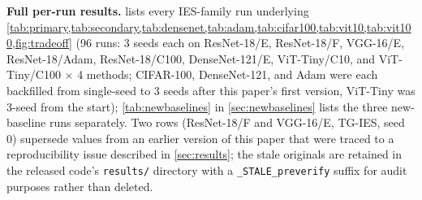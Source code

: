 \documentclass{article}
\theoremstyle{plain}
\theoremstyle{definition}
\theoremstyle{remark}
\begin{document}
\textbf{Full per-run results.}  lists every IES-family run underlying \cref{tab:primary,tab:secondary,tab:densenet,tab:adam,tab:cifar100,tab:vit10,tab:vit100,fig:tradeoff} (96 runs: 3 seeds each on ResNet-18/E, ResNet-18/F, VGG-16/E, ResNet-18/Adam, ResNet-18/C100, DenseNet-121/E, ViT-Tiny/C10, and ViT-Tiny/C100 $\times$ 4 methods; CIFAR-100, DenseNet-121, and Adam were each backfilled from single-seed to 3 seeds after this paper's first version, ViT-Tiny was 3-seed from the start); \cref{tab:newbaselines} in \cref{sec:newbaselines} lists the three new-baseline runs separately. Two rows (ResNet-18/F and VGG-16/E, TG-IES, seed 0) supersede values from an earlier version of this paper that were traced to a reproducibility issue described in \cref{sec:results}; the stale originals are retained in the released code's \texttt{results/} directory with a \texttt{\_STALE\_preverify} suffix for audit purposes rather than deleted.
\end{document}
